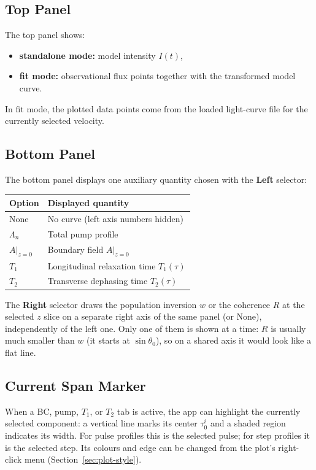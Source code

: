 \documentclass[12pt,a4paper]{article}
\begin{document}
\subsection{Top Panel}

The top panel shows:
\begin{itemize}[noitemsep]
  \item \textbf{standalone mode:} model intensity $I(t)$,
  \item \textbf{fit mode:} observational flux points together with the transformed model curve.
\end{itemize}
In fit mode, the plotted data points come from the loaded light-curve file for the currently selected velocity.

\subsection{Bottom Panel}

The bottom panel displays one auxiliary quantity chosen with the \textbf{Left} selector:
\begin{center}
\begin{tabular}{@{}ll@{}}
  \toprule
  Option & Displayed quantity \\
  \midrule
  None & No curve (left axis numbers hidden) \\
  $\Lambda_n$ & Total pump profile \\
  $A\vert_{z=0}$ & Boundary field $A\vert_{z=0}$ \\
  $T_1$ & Longitudinal relaxation time $T_1(\tau)$ \\
  $T_2$ & Transverse dephasing time $T_2(\tau)$ \\
  \bottomrule
\end{tabular}
\end{center}
The \textbf{Right} selector draws the population inversion $w$ or the coherence $R$ at the
selected $z$ slice on a separate right axis of the same panel (or None), independently of the
left one. Only one of them is shown at a time: $R$ is usually much smaller than $w$ (it starts at
$\sin\theta_0$), so on a shared axis it would look like a flat line.

\subsection{Current Span Marker}\label{sec:current-span}

When a BC, pump, $T_1$, or $T_2$ tab is active, the app can highlight the
currently selected component: a vertical line marks its center $\tau_0^i$
and a shaded region indicates its width. For pulse profiles this is the
selected pulse; for step profiles it is the selected step.
Its colours and edge can be changed from the plot's right-click menu
(Section~\ref{sec:plot-style}).
\end{document}

